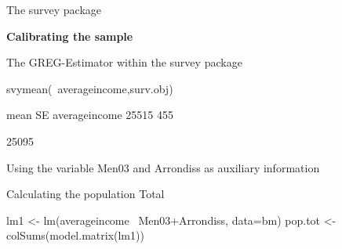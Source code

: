 \documentclass[11pt,german,hideothersubsections]{beamer}
\begin{document}
\begin{frame}[fragile]{The survey package}
\footnotesize{
\begin{center}
\textbf{Calibrating the sample}
\end{center}
\footnotesize{
The GREG-Estimator within the survey package}
\begin{Schunk}
\begin{Sinput}
 svymean(~averageincome,surv.obj)
\end{Sinput}
\begin{Soutput}
               mean  SE
averageincome 25515 455
\end{Soutput}
\begin{Soutput}
[1] 25095
\end{Soutput}
\end{Schunk}
\begin{itemize}\footnotesize{
\item Using the variable Men03 and Arrondiss as auxiliary information 
\item Calculating the population Total}
\end{itemize}

\begin{Schunk}
\begin{Sinput}
 lm1 <- lm(averageincome ~Men03+Arrondiss, data=bm)
 pop.tot <- colSums(model.matrix(lm1))
\end{Sinput}
\end{Schunk}
}
\end{frame}
\end{document}
